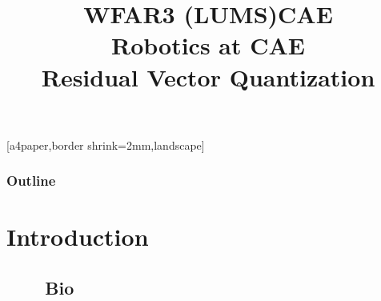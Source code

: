 

\title{WFAR3 (LUMS)}


\mypagenum{}
{
	[a4paper,border shrink=2mm,landscape] 
}
{
}


\begin{frame}[plain]
\logoCAEE\logoCAE
\title{CAE\\Robotics at CAE\\Residual Vector Quantization}
\titlepage
\end{frame}



\begin{frame}
\frametitle{Outline}
\logoCAE
\setcounter{tocdepth}{2}	
\tableofcontents
\end{frame}




\section{Introduction}
\subsection{\ \ \ \ Bio}


